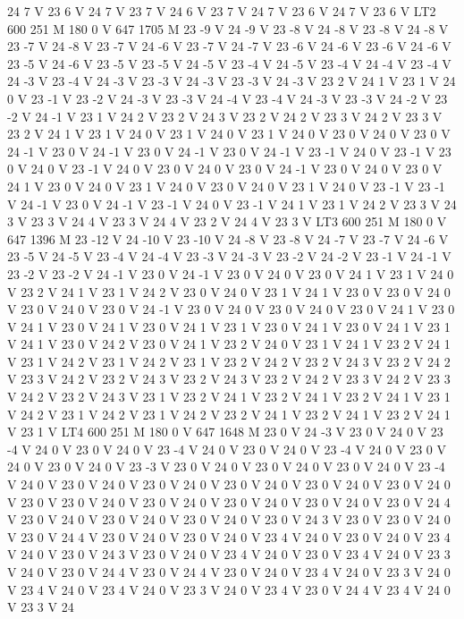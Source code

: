 24 7 V 23 6 V 24 7 V 23 7 V 24 6 V 23 7 V 24 7 V 23 6 V 24 7 V 23 6
V LT2 600 251 M 180 0 V 647 1705 M 23 -9 V 24 -9 V 23 -8 V 24 -8 V
23 -8 V 24 -8 V 23 -7 V 24 -8 V 23 -7 V 24 -6 V 23 -7 V 24 -7 V 23
-6 V 24 -6 V 23 -6 V 24 -6 V 23 -5 V 24 -6 V 23 -5 V 23 -5 V 24 -5
V 23 -4 V 24 -5 V 23 -4 V 24 -4 V 23 -4 V 24 -3 V 23 -4 V 24 -3 V 23
-3 V 24 -3 V 23 -3 V 24 -3 V 23 2 V 24 1 V 23 1 V 24 0 V 23 -1 V 23
-2 V 24 -3 V 23 -3 V 24 -4 V 23 -4 V 24 -3 V 23 -3 V 24 -2 V 23 -2
V 24 -1 V 23 1 V 24 2 V 23 2 V 24 3 V 23 2 V 24 2 V 23 3 V 24 2 V 23
3 V 23 2 V 24 1 V 23 1 V 24 0 V 23 1 V 24 0 V 23 1 V 24 0 V 23 0 V
24 0 V 23 0 V 24 -1 V 23 0 V 24 -1 V 23 0 V 24 -1 V 23 0 V 24 -1 V
23 -1 V 24 0 V 23 -1 V 23 0 V 24 0 V 23 -1 V 24 0 V 23 0 V 24 0 V 23
0 V 24 -1 V 23 0 V 24 0 V 23 0 V 24 1 V 23 0 V 24 0 V 23 1 V 24 0 V
23 0 V 24 0 V 23 1 V 24 0 V 23 -1 V 23 -1 V 24 -1 V 23 0 V 24 -1 V
23 -1 V 24 0 V 23 -1 V 24 1 V 23 1 V 24 2 V 23 3 V 24 3 V 23 3 V 24
4 V 23 3 V 24 4 V 23 2 V 24 4 V 23 3 V LT3 600 251 M 180 0 V 647 1396
M 23 -12 V 24 -10 V 23 -10 V 24 -8 V 23 -8 V 24 -7 V 23 -7 V 24 -6
V 23 -5 V 24 -5 V 23 -4 V 24 -4 V 23 -3 V 24 -3 V 23 -2 V 24 -2 V 23
-1 V 24 -1 V 23 -2 V 23 -2 V 24 -1 V 23 0 V 24 -1 V 23 0 V 24 0 V 23
0 V 24 1 V 23 1 V 24 0 V 23 2 V 24 1 V 23 1 V 24 2 V 23 0 V 24 0 V
23 1 V 24 1 V 23 0 V 23 0 V 24 0 V 23 0 V 24 0 V 23 0 V 24 -1 V 23
0 V 24 0 V 23 0 V 24 0 V 23 0 V 24 1 V 23 0 V 24 1 V 23 0 V 24 1 V
23 0 V 24 1 V 23 1 V 23 0 V 24 1 V 23 0 V 24 1 V 23 1 V 24 1 V 23 0
V 24 2 V 23 0 V 24 1 V 23 2 V 24 0 V 23 1 V 24 1 V 23 2 V 24 1 V 23
1 V 24 2 V 23 1 V 24 2 V 23 1 V 23 2 V 24 2 V 23 2 V 24 3 V 23 2 V
24 2 V 23 3 V 24 2 V 23 2 V 24 3 V 23 2 V 24 3 V 23 2 V 24 2 V 23 3
V 24 2 V 23 3 V 24 2 V 23 2 V 24 3 V 23 1 V 23 2 V 24 1 V 23 2 V 24
1 V 23 2 V 24 1 V 23 1 V 24 2 V 23 1 V 24 2 V 23 1 V 24 2 V 23 2 V
24 1 V 23 2 V 24 1 V 23 2 V 24 1 V 23 1 V LT4 600 251 M 180 0 V 647
1648 M 23 0 V 24 -3 V 23 0 V 24 0 V 23 -4 V 24 0 V 23 0 V 24 0 V 23
-4 V 24 0 V 23 0 V 24 0 V 23 -4 V 24 0 V 23 0 V 24 0 V 23 0 V 24 0
V 23 -3 V 23 0 V 24 0 V 23 0 V 24 0 V 23 0 V 24 0 V 23 -4 V 24 0 V
23 0 V 24 0 V 23 0 V 24 0 V 23 0 V 24 0 V 23 0 V 24 0 V 23 0 V 24 0
V 23 0 V 23 0 V 24 0 V 23 0 V 24 0 V 23 0 V 24 0 V 23 0 V 24 0 V 23
0 V 24 4 V 23 0 V 24 0 V 23 0 V 24 0 V 23 0 V 24 0 V 23 0 V 24 3 V
23 0 V 23 0 V 24 0 V 23 0 V 24 4 V 23 0 V 24 0 V 23 0 V 24 0 V 23 4
V 24 0 V 23 0 V 24 0 V 23 4 V 24 0 V 23 0 V 24 3 V 23 0 V 24 0 V 23
4 V 24 0 V 23 0 V 23 4 V 24 0 V 23 3 V 24 0 V 23 0 V 24 4 V 23 0 V
24 4 V 23 0 V 24 0 V 23 4 V 24 0 V 23 3 V 24 0 V 23 4 V 24 0 V 23 4
V 24 0 V 23 3 V 24 0 V 23 4 V 23 0 V 24 4 V 23 4 V 24 0 V 23 3 V 24
